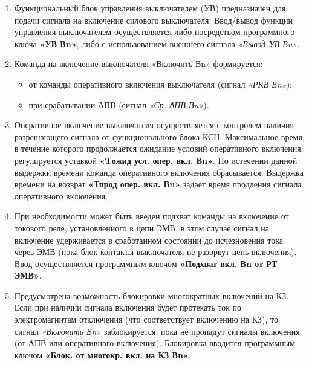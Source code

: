 \color{black}

\begin{enumerate}

\item
Функциональный блок управления выключателем (УВ) предназначен для подачи сигнала на включение
силового выключателя. Ввод/вывод функции управления выключателем осуществляется либо посредством
программного ключа \textbf{«УВ Вn»}, либо с использованием внешнего сигнала \textit{«Вывод УВ Вn»}.

\item
Команда на включение выключателя «Включить Вn» формируется:
\begin{itemize}
\item от команды оперативного включения выключателя (сигнал \textit{«РКВ Вn»});
\item при срабатывании АПВ (сигнал \textit{«Ср. АПВ Вn»}).
\end{itemize}

\item
Оперативное включение выключателя осуществляется с контролем наличия разрешающего сигнала от функционального блока КСН. Максимальное время, в течение которого продолжается ожидание условий оперативного включения, регулируется уставкой \textbf{«Tожид усл. опер. вкл. Вn»}. По истечении данной выдержки времени команда оперативного включения сбрасывается. Выдержка времени на возврат \textbf{«Тпрод опер. вкл. Вn»} задает время продления сигнала оперативного включения.

\item
При необходимости может быть введен подхват команды на включение от токового реле, установленного в цепи ЭМВ, в этом случае сигнал на включение удерживается в сработанном состоянии до исчезновения тока через ЭМВ (пока блок-контакты выключателя не разорвут цепь включения). Ввод осуществляется программным ключом \textbf{«Подхват вкл. Вn от РТ ЭМВ»}.

\item
Предусмотрена возможность блокировки многократных включений на КЗ. Если при наличии сигнала включения будет протекать ток по электромагнитам отключения (что соответствует включению на КЗ), то
сигнал \textit{«Включить Вn»} заблокируется, пока не пропадут сигналы включения (от АПВ или оперативного включения). Блокировка вводится программным ключом \textbf{«Блок. от многокр. вкл. на КЗ Вn»}.


\end{enumerate}
